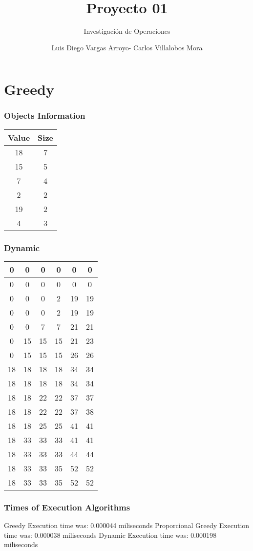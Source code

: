 \documentclass[12]{beamer}
\title{Proyecto 01}
\subtitle{Investigación de Operaciones}
\author{Luis Diego Vargas Arroyo- Carlos Villalobos Mora}
\begin{document}
\frame{\titlepage}
\section{Greedy}
\begin{frame}
\frametitle{Objects Information}

\begin{center}
\begin{adjustbox}{max width=\textwidth}
\small
\begin{tabular}{ |c|c| }
\hline
    Value     &     Size     \\\hline
\hline
  18  & 7 \\ 
\hline
  15  & 5 \\ 
\hline
  7  & 4 \\ 
\hline
  2  & 2 \\ 
\hline
  19  & 2 \\ 
\hline
  4  & 3 \\ 
\hline
\end{tabular}
\end{adjustbox}
\end{center}

\end{frame}
\begin{frame}
\frametitle{Dynamic}

\begin{center}
\begin{adjustbox}{max width=\textwidth}
\small
\begin{tabular}{ |c|c|c|c|c|c|}
\hline
 0 & 0 & 0 & 0 & 0 & 0 \\ 
\hline
 0 & 0 & 0 & 0 & 0 & 0 \\ 
\hline
 0 & 0 & 0 & 2 & 19 & 19 \\ 
\hline
 0 & 0 & 0 & 2 & 19 & 19 \\ 
\hline
 0 & 0 & 7 & 7 & 21 & 21 \\ 
\hline
 0 & 15 & 15 & 15 & 21 & 23 \\ 
\hline
 0 & 15 & 15 & 15 & 26 & 26 \\ 
\hline
 18 & 18 & 18 & 18 & 34 & 34 \\ 
\hline
 18 & 18 & 18 & 18 & 34 & 34 \\ 
\hline
 18 & 18 & 22 & 22 & 37 & 37 \\ 
\hline
 18 & 18 & 22 & 22 & 37 & 38 \\ 
\hline
 18 & 18 & 25 & 25 & 41 & 41 \\ 
\hline
 18 & 33 & 33 & 33 & 41 & 41 \\ 
\hline
 18 & 33 & 33 & 33 & 44 & 44 \\ 
\hline
 18 & 33 & 33 & 35 & 52 & 52 \\ 
\hline
 18 & 33 & 33 & 35 & 52 & 52 \\ 
\hline
\end{tabular}
\end{adjustbox}
\end{center}

\end{frame}
\begin{frame}
\frametitle{Times of Execution Algorithms}

\begin{center}
Greedy Execution time was:  0.000044 miliseconds 
\newline
Proporcional Greedy Execution time was:  0.000038    miliseconds
Dynamic Execution time was:  0.000198  miliseconds 
\end{center}

\end{frame}
\end{document}
